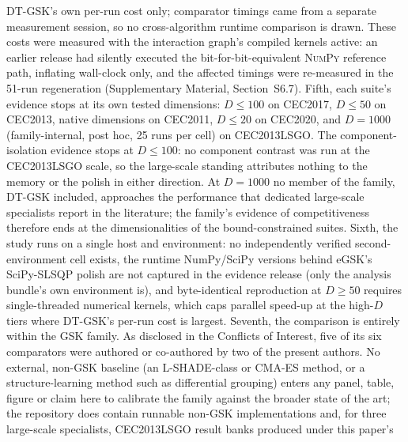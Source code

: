 \documentclass[algorithms,article,submit,moreauthors,pdftex]{Definitions/mdpi}
\newcommand{\dtgsk}{DT-GSK}
\newcommand{\egsk}{eGSK}
\begin{document}
\dtgsk{}'s own per-run cost only; comparator timings came from a separate
measurement session, so no cross-algorithm runtime comparison is drawn. These costs were
measured with the interaction graph's compiled kernels active: an
earlier release had silently executed the bit-for-bit-equivalent
\textsc{NumPy} reference path, inflating wall-clock only, and the
affected timings were re-measured in the 51-run regeneration
(Supplementary Material, Section~S6.7). %
Fifth, each suite's evidence stops at its own tested dimensions:
$D \le 100$ on CEC2017, $D \le 50$ on CEC2013, native dimensions on CEC2011,
$D \le 20$ on CEC2020, and $D = 1000$ (family-internal, post hoc, 25 runs
per cell) on CEC2013LSGO. The component-isolation evidence stops at
$D \le 100$: no component contrast was run at the CEC2013LSGO scale, so
the large-scale standing attributes nothing to the memory or the polish
in either direction. At $D = 1000$ no member of the family, \dtgsk{}
included, approaches the performance that dedicated large-scale
specialists report in the literature; the family's evidence of
competitiveness therefore ends at the dimensionalities of the
bound-constrained suites. %
Sixth, the study runs on a single host and environment: no
independently verified second-environment cell exists, the runtime
NumPy/SciPy versions behind \egsk{}'s SciPy-SLSQP polish are not
captured in the evidence release (only the analysis bundle's own
environment is), and byte-identical reproduction at $D \geq 50$ requires
single-threaded numerical kernels, which caps parallel speed-up at the
high-$D$ tiers where \dtgsk{}'s per-run cost is largest.
Seventh, the comparison is entirely within the GSK family. As
disclosed in the Conflicts of Interest, five of its six comparators were
authored or co-authored by two of the present authors. No external, non-GSK
baseline (an L-SHADE-class or CMA-ES method, or a structure-learning
method such as differential grouping) enters any panel, table, figure or
claim here to calibrate the family against the broader state of the art; the
repository does contain runnable non-GSK implementations and, for three
large-scale specialists, CEC2013LSGO result banks produced under this paper's
\end{document}
